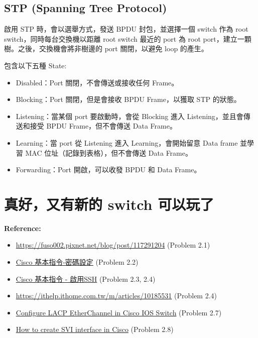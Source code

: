 \documentclass[12pt]{article}
\newenvironment{problem}[2][Problem]{\begin{trivlist}
\item[\hskip \labelsep {\bfseries #1}\hskip \labelsep {\bfseries #2}]}{\end{trivlist}}
\newenvironment{mycolorbox}[1][gray]{
  \renewmdenv[
    linewidth=2pt, linecolor=#1, backgroundcolor=#1!10,
    topline=false, bottomline=false, rightline=false,
    skipabove=10pt, skipbelow=10pt, innerleftmargin=10pt,
    innerrightmargin=0pt, innertopmargin=5pt, innerbottommargin=5pt
  ]{myquote}
  \begin{myquote}
}{\end{myquote}}
\begin{document}
\subsection{STP (Spanning Tree Protocol)}
\begin{problem}{1.4 (a)}
  啟用 STP 時，會以選舉方式，發送 BPDU 封包，並選擇一個 switch 作為 root switch，同時每台交換機以距離 root switch 最近的 port 為 root port，建立一顆樹。之後，交換機會將非樹邊的 port 關閉，以避免 loop 的產生。
\end{problem}
\begin{problem}{1.4 (b)}
  包含以下五種 State:
  \begin{itemize}[itemsep=0em]
    \item Disabled：Port 關閉，不會傳送或接收任何 Frame。
    \item Blocking：Port 關閉，但是會接收 BPDU Frame，以獲取 STP 的狀態。
    \item Listening：當某個 port 要啟動時，會從 Blocking 進入 Listening，並且會傳送和接受 BPDU Frame，但不會傳送 Data Frame。
    \item Learning：當 port 從 Listening 進入 Learning，會開始留意 Data frame 並學習 MAC 位址（記錄到表格），但不會傳送 Data Frame。
    \item Forwarding：Port 開啟，可以收發 BPDU 和 Data Frame。
  \end{itemize}
\end{problem}

\section{真好，又有新的 switch 可以玩了}

\begin{mycolorbox}[teal]
  \textbf{Reference:}
  \begin{itemize}
    \item \url{https://fuso002.pixnet.net/blog/post/117291204} (Problem 2.1)
    \item \href{https://david50.pixnet.net/blog/post/45217572}{Cisco 基本指令-密碼設定} (Problem 2.2)
    \item \href{https://david50.pixnet.net/blog/post/45217866}{Cisco 基本指令 - 啟用SSH} (Problem 2.3, 2.4)
    \item \url{https://ithelp.ithome.com.tw/m/articles/10185531} (Problem 2.4)
    \item \href{https://www.cloudtechadmin.com/configure-lacp-etherchannel-in-cisco-ios-switch/}{Configure LACP EtherChannel in Cisco IOS Switch} (Problem 2.7)
    \item \href{https://www.grandmetric.com/knowledge-base/design_and_configure/how-to-create-svi-interface-cisco/}{How to create SVI interface in Cisco} (Problem 2.8)
  \end{itemize}
\end{mycolorbox}
\end{document}
